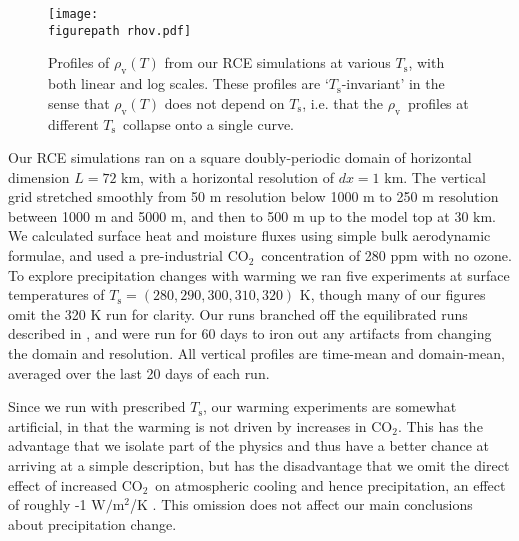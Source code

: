 \documentclass[9pt,twocolumn,twoside,lineno]{pnas-new}
\newcommand{\cotwo}{\ensuremath{\mathrm{CO_2}}}
\newcommand{\Wmsq}{\ensuremath{\mathrm{W/m^2}}}
\newcommand{\rhov}{\ensuremath{\rho_\mathrm{v}}}
\newcommand{\Ts}{\ensuremath{T_\mathrm{s}}}
\newcommand{\figurepath}{../../figures/}
\begin{document}
\begin{figure}[t]
	\begin{center}
			\texttt{[image: \\figurepath rhov.pdf]}
		\caption{Profiles of $\rhov(T)$ from our RCE simulations at various \Ts, with both linear and log scales. These profiles are `\Ts-invariant' in the sense that $\rhov(T)$ does not depend on \Ts, i.e. that the \rhov\ profiles at different \Ts\ collapse onto a single curve.
		\label{rhov_fig}
		}
	\end{center}
\end{figure}

	
	Our RCE simulations ran on a square doubly-periodic domain of horizontal dimension $L=72$ km, with  a horizontal resolution of $dx=1$ km. The vertical grid stretched smoothly from 50 m resolution below 1000 m to 250 m resolution between 1000 m and 5000 m, and then to 500 m up to the model top at  30 km. We calculated surface heat and moisture fluxes using simple bulk aerodynamic formulae, and used a pre-industrial \cotwo\  concentration of 280 ppm with no ozone. To explore precipitation changes  with warming we ran five experiments at surface temperatures of $\Ts=(280,290,300,310,320)$ K, though many of our figures omit the 320 K run for clarity. Our runs branched off the equilibrated runs described in \cite{romps2014}, and were run for 60 days  to iron out any artifacts from changing the domain and resolution. All vertical profiles are time-mean and domain-mean, averaged over the last 20 days of each run. 
	
Since we run with prescribed \Ts, our warming experiments are somewhat artificial, in that the warming is not driven by increases in \cotwo. This has the advantage that we isolate part of the physics and thus have a better chance at arriving at a simple description, but has the disadvantage that we omit the direct effect of increased \cotwo\ on atmospheric cooling and hence precipitation, an effect of roughly -1 \Wmsq/K \cite{pendergrass2014}. This omission does not affect our main conclusions about precipitation change.



\end{document}
